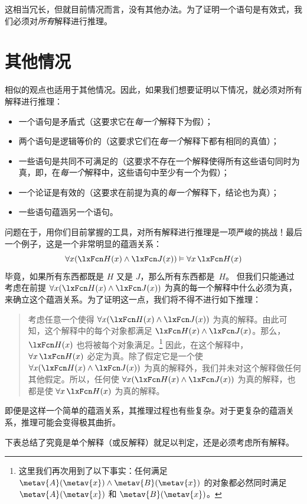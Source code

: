 这相当冗长，但就目前情况而言，没有其他办法。为了证明一个语句是有效式，我们必须对\emph{所有}解释进行推理。

\section{其他情况}
相似的观点也适用于其他情况。因此，如果我们想要证明以下情况，就必须对所有解释进行推理：


\begin{itemize}
		\item 一个语句是矛盾式（这要求它在\emph{每一个}解释下为假）；
		\item 两个语句是逻辑等价的（这要求它们在\emph{每一个}解释下都有相同的真值）；
		\item 一些语句是共同不可满足的（这要求不存在一个解释使得所有这些语句同时为真，即，在\emph{每一个}解释中，这些语句中至少有一个为假）；
		\item 一个论证是有效的（这要求在前提为真的\emph{每一个}解释下，结论也为真）；
		\item 一些语句蕴涵另一个语句。
	\end{itemize}


问题在于，用你们目前掌握的工具，对所有解释进行推理是一项严峻的挑战！最后一个例子，这是一个非常明显的蕴涵关系：
	$$\forall x(\atom{H}{x} \eand \atom{J}{x}) \entails \forall x\, \atom{H}{x}$$
毕竟，如果所有东西都既是 $H$ 又是 $J$，那么所有东西都是~$H$。
但我们只能通过考虑在前提 $\forall
x(\atom{H}{x} \eand \atom{J}{x})$ 为真的每一个解释中什么必须为真，来确立这个蕴涵关系。为了证明这一点，我们将不得不进行如下推理：


\begin{quote}
		考虑任意一个使得 $\forall x(\atom{H}{x} \eand \atom{J}{x})$ 为真的解释。由此可知，这个解释中的每个对象都满足 $\atom{H}{x} \eand \atom{J}{x}$。那么，$\atom{H}{x}$ 也将被每个对象满足。\footnote{这里我们再次用到了以下事实：任何满足 $\metav{A}(\metav{x}) \land \metav{B}(\metav{x})$ 的对象都必然同时满足 $\metav{A}(\metav{x})$ 和 $\metav{B}(\metav{x})$。} 因此，在这个解释中，$\forall x\, \atom{H}{x}$ 必定为真。除了假定它是一个使 $\forall x(\atom{H}{x} \eand \atom{J}{x})$ 为真的解释外，我们并未对这个解释做任何其他假定。所以，任何使 $\forall x(\atom{H}{x} \eand \atom{J}{x})$ 为真的解释，也都是使 $\forall x\, \atom{H}{x}$ 为真的解释。
\end{quote}


即便是这样一个简单的蕴涵关系，其推理过程也有些复杂。对于更复杂的蕴涵关系，推理可能会变得极其曲折。

下表总结了究竟是单个解释（或反解释）就足以判定，还是必须考虑所有解释。

